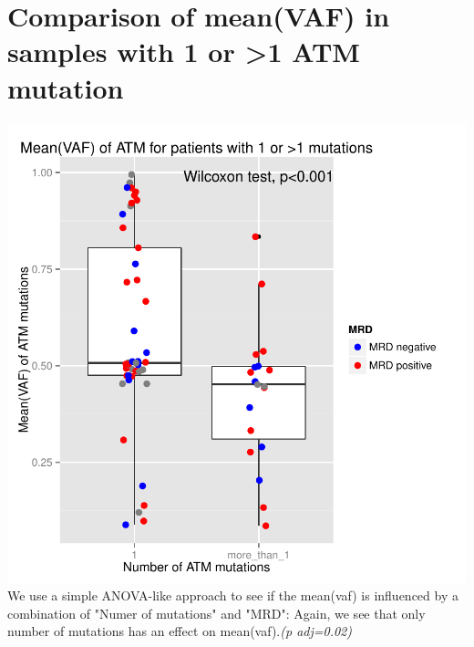 \documentclass[a4paper,11pt]{article}
\begin{document}
\section*{Comparison of mean(VAF) in samples with 1 or >1 ATM mutation}
\includegraphics{ATM_VAF-016}
\\We use a simple ANOVA-like approach to see if the mean(vaf) is influenced by a combination of "Numer of mutations" and "MRD": Again, we see that only number of mutations has an effect on mean(vaf).\emph{(p adj=0.02)}\\
\end{document}
